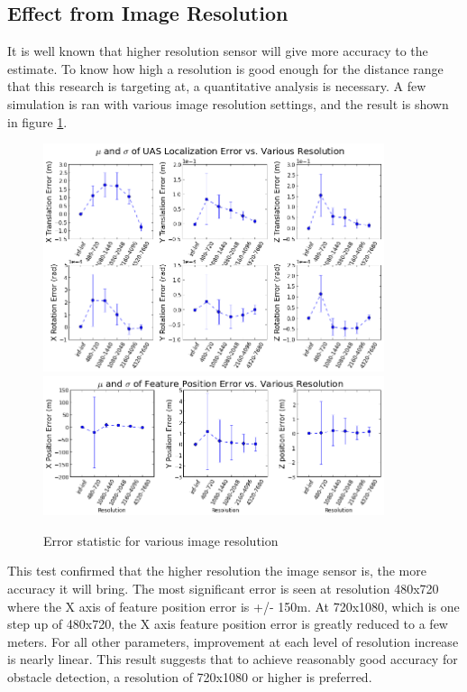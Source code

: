\FloatBarrier

\subsection{Effect from Image Resolution}

It is well known that higher resolution sensor will give more accuracy to the estimate. To know how high a resolution is good enough for the distance range that this research is targeting at, a quantitative analysis is necessary. A few simulation is ran with various image resolution settings, and the result is shown in figure \ref{fig:simfig50}. 

\begin{figure}[h] 
  \centering
  \includegraphics[width=10cm,keepaspectratio=true]{./Figures/SimulationFigures/Figure50.png}
  \includegraphics[width=10cm,keepaspectratio=true]{./Figures/SimulationFigures/Figure49.png}
  \caption{Error statistic for various image resolution}
  \label{fig:simfig50}
\end{figure}

This test confirmed that the higher resolution the image sensor is, the more accuracy it will bring. The most significant error is seen at resolution 480x720 where the X axis of feature position error is +/- 150m. At 720x1080, which is one step up of 480x720, the X axis feature position error is greatly reduced to a few meters. For all other parameters, improvement at each level of resolution increase is nearly linear. This result suggests that to achieve reasonably good accuracy for obstacle detection, a resolution of 720x1080 or higher is preferred. 


